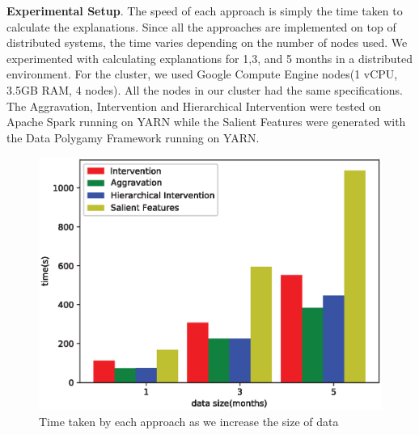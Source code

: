 \textbf{Experimental Setup}. The speed of each approach is simply the time taken to calculate the explanations. Since all the approaches are implemented on top of distributed systems, the time varies depending on the number of nodes used. We experimented with calculating explanations for 1,3, and 5 months in a distributed environment. For the cluster, we used Google Compute Engine nodes(1 vCPU, 3.5GB RAM, 4 nodes). All the nodes in our cluster had the same specifications. The Aggravation, Intervention and Hierarchical Intervention were tested on Apache Spark running on YARN while the Salient Features were generated with the Data Polygamy Framework running on YARN.
\begin{figure}[h]
\includegraphics[width=\columnwidth]{images/performance}
\caption{Time taken by each approach as we increase the size of data}
\label{fig:performance}
\end{figure}
